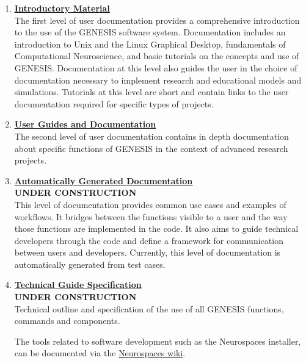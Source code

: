 \documentclass[12pt]{article}
\begin{document}
\begin{enumerate}

\item \href{../contents-level1/contents-level1.pdf}{\bf \underline{Introductory Material}}\\
The first level of user documentation provides a comprehensive introduction to the use of the GENESIS software system. Documentation includes an introduction to Unix and the Linux Graphical Desktop, fundamentals of Computational Neuroscience, and basic tutorials on the concepts and use of GENESIS. Documentation at this level also guides the user
  in the choice of documentation necessary to implement
  research and educational models and simulations.  Tutorials at this level
  are short and contain links to the user documentation required for
  specific types of projects.  

\item \href{../contents-level2/contents-level2.pdf}{\bf \underline{User Guides and Documentation}}\\
The second level of user documentation contains in depth
  documentation about specific functions of GENESIS in the context of
  advanced research projects.

\item \href{../contents-level3/contents-level3.pdf}{\bf \underline{Automatically Generated Documentation}}\\
 {\bf UNDER CONSTRUCTION}\\
  This level of documentation provides common use cases and examples of workflows. It bridges between the functions visible to
  a user and the way those functions are implemented in the code.
  It also aims to guide technical developers through the code
  and define a framework for communication between users and developers.
  Currently, this level of documentation is automatically generated
  from test cases.
  
 \item \href{../contents-level4/contents-level4.pdf}{\bf \underline{Technical Guide Specification}}\\
 {\bf UNDER CONSTRUCTION}\\
  Technical outline
  and specification of the use of all GENESIS functions, commands and
  components.

  The tools related to software development such as the Neurospaces
  installer, can be documented via the \href{http://code.google.com/p/neurospaces/wiki/Index}{Neurospaces wiki}.


\end{enumerate}
\end{document}
